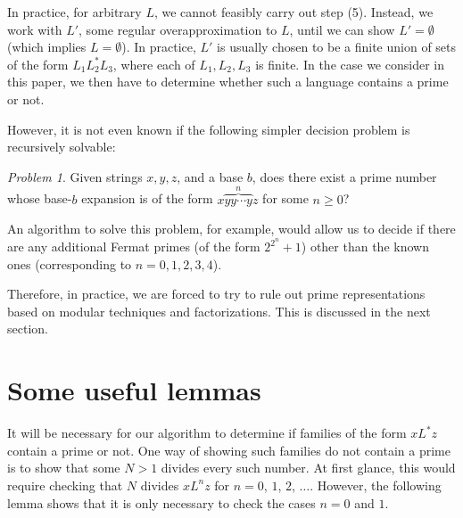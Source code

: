 \documentclass[12pt]{article}
\theoremstyle{plain}
\theoremstyle{definition}
\theoremstyle{remark}
\newtheorem{problem}[theorem]{Problem}
\newcommand{\0}{\mathtt{0}}
\newcommand{\1}{\mathtt{1}}
\newcommand{\2}{\mathtt{2}}
\newcommand{\3}{\mathtt{3}}
\newcommand{\4}{\mathtt{4}}
\newcommand{\5}{\mathtt{5}}
\newcommand{\6}{\mathtt{6}}
\newcommand{\7}{\mathtt{7}}
\newcommand{\8}{\mathtt{8}}
\newcommand{\9}{\mathtt{9}}
\begin{document}
In practice, for arbitrary $L$,
we cannot feasibly carry out step (5).  Instead, we work
with $L'$, some regular overapproximation to $L$, until we can show $L' =
\emptyset$ (which implies $L = \emptyset$).  In practice,
$L'$ is usually chosen to be a finite union of sets of the form 
$L_1 L_2^* L_3$, where each of $L_1, L_2, L_3$ is finite.
In the case we consider in this paper,
we then have to determine whether such a language contains
a prime or not.

However, it is not even known if the following simpler decision problem is 
recursively solvable:

\medskip

\begin{problem}
Given strings $x, y, z$, and a base $b$, does there exist a prime
number whose base-$b$ expansion is of the form $x \overbrace{yy\cdots y}^n z$
for some $n \geq 0$?
\end{problem}

\medskip

An algorithm to solve this problem, for example, would allow us to decide
if there are any additional Fermat primes (of the form $2^{2^n}+1$)
other than the known ones (corresponding to $n = 0,1,2,3,4$).

Therefore, in practice, we are forced to try to rule out prime
representations based on modular techniques and factorizations.
This is discussed in the next section.

\section{Some useful lemmas}
It will be necessary for our algorithm to determine if families of the
form $xL^*z$ contain a prime or not.  One way of showing such families
do not contain a prime is to show that some $N>1$ 
divides every such number.  At first glance, this would require
checking that $N$ divides $xL^nz$ for $n=0$, $1$, $2$, $\dotsc$.
However, the following lemma shows that it is only necessary to check
the cases $n=0$ and $1$.
\end{document}
